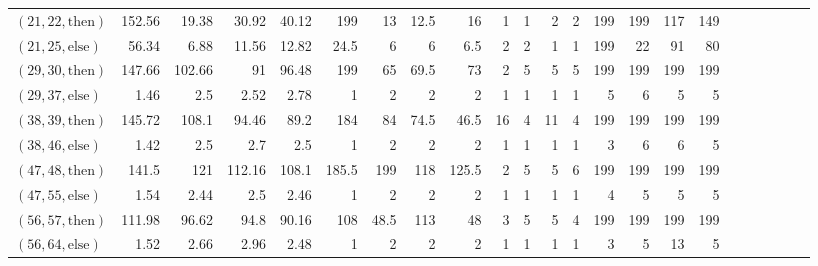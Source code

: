 \documentclass[sigconf]{acmart}
\newcommand{\thenBr}{\text{then}}
\newcommand{\elseBr}{\text{else}}
\begin{document}
\begin{table*}
{\begin{tabular}{l|rrrr|rrrr|rrrr|rrrr|r|r|r|r|r|r}
    $(21,22,\thenBr)$ & 152.56      & 19.38       & 30.92          & 40.12         & 199   & 13    & 12.5    & 16      & 1        & 1        & 2          & 2           & 199      & 199     & 117        & 149 & & & & & & \\
    $(21,25,\elseBr)$ & 56.34       & 6.88        & 11.56          & 12.82         & 24.5  & 6     & 6       & 6.5     & 2        & 2        & 1          & 1           & 199      & 22      & 91         & 80 & & & & & & \\
    $(29,30,\thenBr)$ & 147.66      & 102.66      & 91             & 96.48         & 199   & 65    & 69.5    & 73      & 2        & 5        & 5          & 5           & 199      & 199     & 199        & 199& & & & & & \\
    $(29,37,\elseBr)$ & 1.46        & 2.5         & 2.52           & 2.78          & 1     & 2     & 2       & 2       & 1        & 1        & 1          & 1           & 5        & 6       & 5          & 5 & & & & & & \\
    $(38,39,\thenBr)$ & 145.72      & 108.1       & 94.46          & 89.2          & 184   & 84    & 74.5    & 46.5    & 16       & 4        & 11         & 4           & 199      & 199     & 199        & 199& & & & & & \\
    $(38,46,\elseBr)$ & 1.42        & 2.5         & 2.7            & 2.5           & 1     & 2     & 2       & 2       & 1        & 1        & 1          & 1           & 3        & 6       & 6          & 5 & & & & & & \\
    $(47,48,\thenBr)$ & 141.5       & 121         & 112.16         & 108.1         & 185.5 & 199   & 118     & 125.5   & 2        & 5        & 5          & 6           & 199      & 199     & 199        & 199 & & & & & & \\
    $(47,55,\elseBr)$ & 1.54        & 2.44        & 2.5            & 2.46          & 1     & 2     & 2       & 2       & 1        & 1        & 1          & 1           & 4        & 5       & 5          & 5 & & & & & & \\
    $(56,57,\thenBr)$ & 111.98      & 96.62       & 94.8           & 90.16         & 108   & 48.5  & 113     & 48      & 3        & 5        & 5          & 4           & 199      & 199     & 199        & 199 & & & & & & \\
    $(56,64,\elseBr)$ & 1.52        & 2.66        & 2.96           & 2.48          & 1     & 2     & 2       & 2       & 1        & 1        & 1          & 1           & 3        & 5       & 13         & 5 & & & & & & \\

\end{tabular}}
\end{table*}
\end{document}
